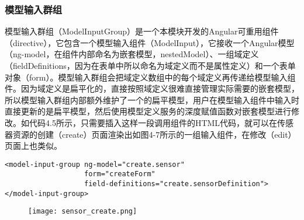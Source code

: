 \subsubsection{模型输入群组}
模型输入群组（ModelInputGroup）是一个本模块开发的Angular可重用组件（directive），它包含一个模型输入组件（ModelInput），它接收一个Angular模型（ng-model，在组件内部命名为嵌套模型，nestedModel）、一组域定义（fieldDefinitions，因为在表单中所以命名为域定义而不是属性定义）和一个表单对象（form）。模型输入群组会把域定义数组中的每个域定义再传递给模型输入组件。因为域定义是扁平化的，直接按照域定义很难直接管理实际需要的嵌套模型，所以模型输入群组内部额外维护了一个的扁平模型，用户在模型输入组件中输入时直接更新的是扁平模型，然后使用模型定义服务的深度赋值函数对嵌套模型进行修改。如代码4.5所示，只需要插入这样一段调用组件的HTML代码，就可以在传感器资源的创建（create）页面渲染出如图4-7所示的一组输入组件，在修改（edit）页面上也类似。
\begin{lstlisting}[language={HTML5}, caption={传感器创建页面中的模型输入群组代码}]
<model-input-group ng-model="create.sensor"
                   form="createForm"
                   field-definitions="create.sensorDefinition">
</model-input-group>
\end{lstlisting}
\begin{figure}[H]
 \centering
 \texttt{[image: sensor\_create.png]}
\end{figure}
